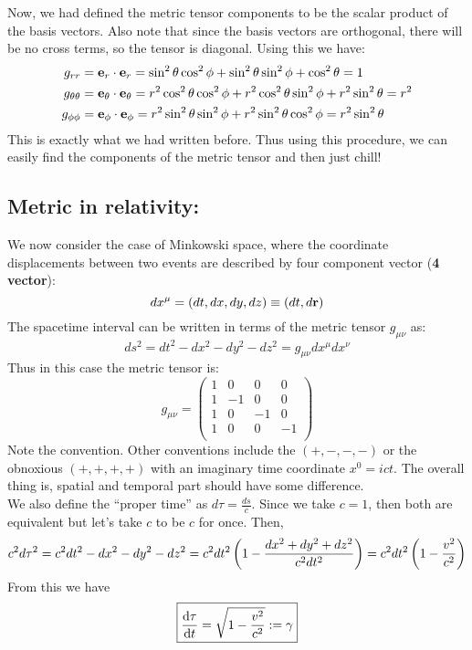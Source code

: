 Now, we had defined the metric tensor components to be the scalar product of the basis vectors. Also note that since the basis vectors are orthogonal, there will be no cross terms, so the tensor is diagonal. Using this we have:
\begin{align*}
    g_{rr} &= \boldsymbol{\mathbf{e}}_r\cdot \boldsymbol{\mathbf{e}}_r = \sin^2\theta \cos^2\phi + \sin^2\theta \sin^2\phi + \cos^2\theta = 1\\
    g_{\theta\theta} &= \boldsymbol{\mathbf{e}}_\theta\cdot \boldsymbol{\mathbf{e}}_\theta = r^2 \cos^2\theta \cos^2\phi + r^2 \cos^2\theta \sin^2\phi + r^2 \sin^2\theta = r^2\\
    g_{\phi\phi} &= \boldsymbol{\mathbf{e}}_\phi\cdot \boldsymbol{\mathbf{e}}_\phi = r^2 \sin^2\theta \sin^2\phi + r^2 \sin^2\theta \cos^2\phi = r^2 \sin^2\theta
\end{align*}
This is exactly what we had written before. Thus using this procedure, we can easily find the components of the metric tensor and then just chill! 
\subsection{Metric in relativity:}
We now consider the case of Minkowski space, where the coordinate displacements between two events are described by four component vector (\textbf{4 vector}):
$$dx^\mu = (dt, dx,dy,dz)\equiv (dt, d\boldsymbol{\mathbf{r}})$$
The spacetime interval can be written in terms of the metric tensor $g_{\mu\nu}$ as:
$$ds^2 = dt^2-dx^2-dy^2-dz^2= g_{\mu\nu} dx^\mu dx^\nu$$
Thus in this case the metric tensor is:
$$g_{\mu\nu} = \begin{pmatrix}
    1 & 0 & 0 & 0\\
     1 & -1 & 0 & 0\\
      1 & 0 & -1 & 0\\
       1 & 0 & 0 & -1\\
\end{pmatrix}$$
Note the convention. Other conventions include the $(+,-,-,-)$ or the obnoxious $(+,+,+,+)$ with an imaginary time coordinate $x^0=ict$. The overall thing is, spatial and temporal part should have some difference.\\[0.3cm] We also define the ``proper time'' as $d\tau = \frac{ds}{c}$. Since we take $c=1$, then both are equivalent but let's take $c$ to be $c$ for once. Then,
$$c^2 d\tau^2 = c^2dt^2-dx^2-dy^2-dz^2 = c^2dt^2\left( 1 - \frac{dx^2+dy^2+dz^2}{c^2dt^2} \right) = c^2dt^2\left( 1-\frac{v^2}{c^2} \right)$$
From this we have
$$\boxed{\dv{\tau}{t} = \sqrt{1- \frac{v^2}{c^2}}:=\gamma}$$

